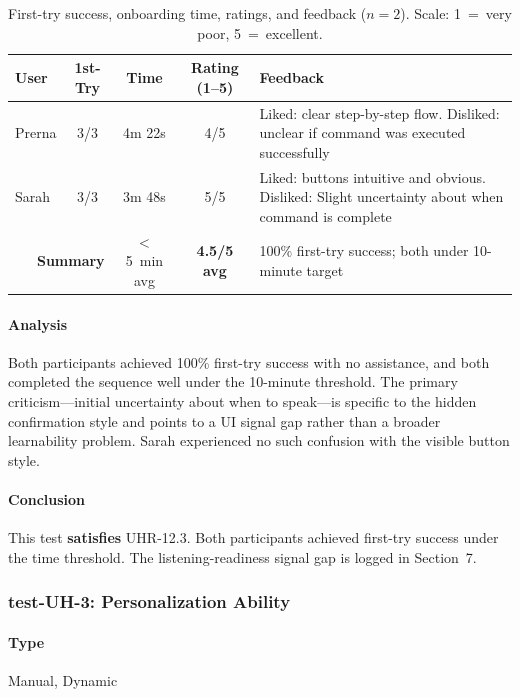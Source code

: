 \documentclass[12pt, titlepage]{article}
\begin{document}
\begin{table}[H]
\centering
\caption{First-try success, onboarding time, ratings, and feedback ($n=2$).
  Scale: 1~=~very poor, 5~=~excellent.}
\begin{tabular}{|l|c|c|c|p{5cm}|}
\hline
\textbf{User} & \textbf{1st-Try} & \textbf{Time} &
  \textbf{Rating (1--5)} & \textbf{Feedback} \\ \hline
Prerna & 3/3 & 4m 22s & 4/5 &
  Liked: clear step-by-step flow.\newline
  Disliked: unclear if command was executed successfully \\ \hline
Sarah & 3/3 & 3m 48s & 5/5 &
  Liked: buttons intuitive and obvious.\newline
  Disliked: Slight uncertainty about when command is complete \\ \hline
\multicolumn{2}{|r|}{\textbf{Summary}} & $<$5~min avg &
  \textbf{4.5/5 avg} &
  100\% first-try success; both under 10-minute target \\ \hline
\end{tabular}
\label{tab:uh2}
\end{table}

\paragraph{Analysis}
Both participants achieved 100\% first-try success with no assistance, and
both completed the sequence well under the 10-minute threshold. The primary
criticism---initial uncertainty about when to speak---is specific to the
hidden confirmation style and points to a UI signal gap rather than a broader
learnability problem. Sarah experienced no such confusion with the visible
button style.

\paragraph{Conclusion}
This test \textbf{satisfies} UHR-12.3. Both participants achieved first-try
success under the time threshold. The listening-readiness signal gap is
logged in Section~7.
\subsubsection{test-UH-3: Personalization Ability}

\paragraph{Type} Manual, Dynamic
\end{document}
